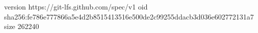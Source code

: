 version https://git-lfs.github.com/spec/v1
oid sha256:fe786e777866a5e4d2b8515413516e500de2c99255ddacb3d036e602772131a7
size 262240
